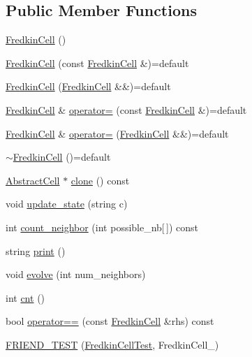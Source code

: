 \subsection*{Public Member Functions}
\begin{DoxyCompactItemize}
\item 
\hyperlink{classFredkinCell_ac5bd5726da496a3b3363d9c1b57dccc2}{Fredkin\-Cell} ()
\item 
\hyperlink{classFredkinCell_aa2c87b549c4010b0e9197fdc66a8e370}{Fredkin\-Cell} (const \hyperlink{classFredkinCell}{Fredkin\-Cell} \&)=default
\item 
\hyperlink{classFredkinCell_a0599a144fd1da99eb3c2d7ba2e877612}{Fredkin\-Cell} (\hyperlink{classFredkinCell}{Fredkin\-Cell} \&\&)=default
\item 
\hyperlink{classFredkinCell}{Fredkin\-Cell} \& \hyperlink{classFredkinCell_affbde57cf5558cc2192d33565376162b}{operator=} (const \hyperlink{classFredkinCell}{Fredkin\-Cell} \&)=default
\item 
\hyperlink{classFredkinCell}{Fredkin\-Cell} \& \hyperlink{classFredkinCell_afc5ff658d0e406c105c3d6c54e4af41e}{operator=} (\hyperlink{classFredkinCell}{Fredkin\-Cell} \&\&)=default
\item 
\hyperlink{classFredkinCell_a4f9b0eb36ebbfe71f2e2c51d5ddedbf9}{$\sim$\-Fredkin\-Cell} ()=default
\item 
\hyperlink{classAbstractCell}{Abstract\-Cell} $\ast$ \hyperlink{classFredkinCell_a89984e2ceee786e199f3d5cd5ab46536}{clone} () const 
\item 
void \hyperlink{classFredkinCell_a55fa842b999a1293d08be7d3a75cb537}{update\-\_\-state} (string c)
\item 
int \hyperlink{classFredkinCell_a695f37645d14ba1faa11518a70b3351a}{count\-\_\-neighbor} (int possible\-\_\-nb\mbox{[}$\,$\mbox{]}) const 
\item 
string \hyperlink{classFredkinCell_a54ba3c20d52deebd57c557748cd36bb8}{print} ()
\item 
void \hyperlink{classFredkinCell_acd5eb2ee81b8ba40cd943c5c6ed638bc}{evolve} (int num\-\_\-neighbors)
\item 
int \hyperlink{classFredkinCell_a9721fe3c5efbb6abc6feabdbde7069cf}{cnt} ()
\item 
bool \hyperlink{classFredkinCell_aed3fa6ffee65c92edee50f1b46187025}{operator==} (const \hyperlink{classFredkinCell}{Fredkin\-Cell} \&rhs) const 
\item 
\hyperlink{classFredkinCell_ae0278ae959ce969781883db5c707ecd0}{F\-R\-I\-E\-N\-D\-\_\-\-T\-E\-S\-T} (\hyperlink{classFredkinCell_aef267ce10e0a76047d409a41033eea05}{Fredkin\-Cell\-Test}, Fredkin\-Cell\-\_)

\end{DoxyCompactItemize}

